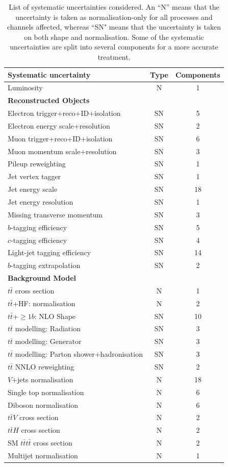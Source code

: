 \begin{table}[htb!]
\centering
\begin{tabular}{lcc}
\toprule\toprule
Systematic uncertainty & Type  & Components \\
\midrule
Luminosity                  &  N & 1\\\midrule\midrule
{\bf Reconstructed Objects}                 &   & \\
Electron trigger+reco+ID+isolation              & SN & 5 \\
Electron energy scale+resolution & SN & 2 \\
Muon trigger+reco+ID+isolation                    &  SN & 6 \\
Muon momentum scale+resolution & SN & 3 \\ \midrule
Pileup reweighting         & SN    & 1\\
Jet vertex tagger         & SN    & 1\\
Jet energy scale            & SN & 18\\
Jet energy resolution       & SN & 1\\
Missing transverse momentum  & SN & 3\\ \midrule
$b$-tagging efficiency      & SN & 5\\
$c$-tagging efficiency      & SN & 4\\
Light-jet tagging efficiency    & SN & 14\\ \midrule
$b$-tagging extrapolation & SN & 2 \\ \midrule
{\bf Background Model}                 &   & \\
$t\bar{t}$ cross section    &  N & 1\\
$t\bar{t}$+HF: normalisation & N & 2 \\
$t\bar{t}$+$\geq1b$: NLO Shape & SN & 10 \\
$t\bar{t}$ modelling: Radiation & SN & 3\\
$t\bar{t}$ modelling: Generator & SN & 3\\
$t\bar{t}$ modelling: Parton shower+hadronisation & SN & 3 \\
$t\bar{t}$ NNLO reweighting  & SN & 2\\ \midrule
$V$+jets normalisation      &  N & 18\\
Single top normalisation    &  N & 6\\
Diboson normalisation  &  N & 6\\
$t\bar{t}V$ cross section   &  N & 2\\
$t\bar{t}H$ cross section & N & 2 \\
SM $t\bar{t}t\bar{t}$ cross section & N & 2 \\
Multijet normalisation  &  N & 1\\
\bottomrule\bottomrule
\end{tabular}
\captionsetup{width=0.85\textwidth}  \caption{\small List of systematic uncertainties considered. An ``N'' means that the uncertainty is taken as normalisation-only for all 
processes and channels affected, whereas ``SN" means that the uncertainty is taken on both shape and normalisation. Some of the systematic uncertainties are split into several components for a more accurate treatment.}
\label{chp:vlq:tab:SystSummary}
\end{table}

